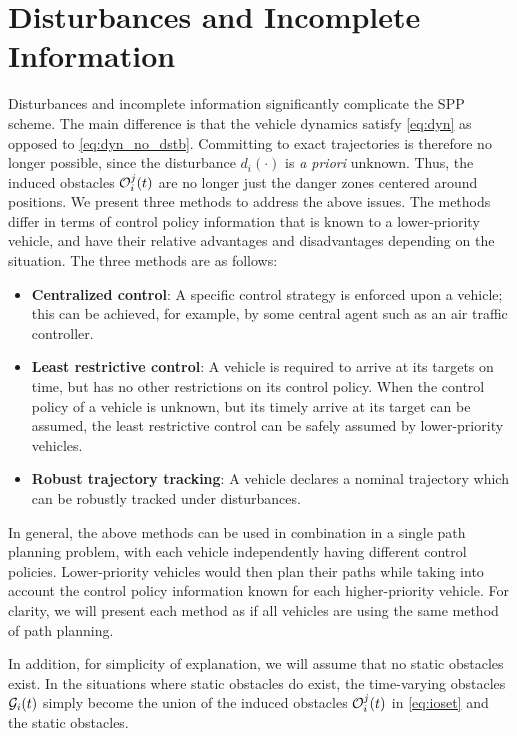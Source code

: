 \section{Disturbances and Incomplete Information \label{sec:incomp}}
Disturbances and incomplete information significantly complicate the SPP scheme. The main difference is that the vehicle dynamics satisfy \eqref{eq:dyn} as opposed to \eqref{eq:dyn_no_dstb}. Committing to exact trajectories is therefore no longer possible, since the disturbance $d_i(\cdot)$ is \textit{a priori} unknown. Thus, the induced obstacles $\mathcal{O}_i^j(t)$ are no longer just the danger zones centered around positions. We present three methods to address the above issues. The methods differ in terms of control policy information that is known to a lower-priority vehicle, and have their relative advantages and disadvantages depending on the situation. The three methods are as follows:
\begin{itemize}
\item \textbf{Centralized control}: A specific control strategy is enforced upon a vehicle; this can be achieved, for example, by some central agent such as an air traffic controller.
\item \textbf{Least restrictive control}: A vehicle is required to arrive at its targets on time, but has no other restrictions on its control policy. When the control policy of a vehicle is unknown, but its timely arrive at its target can be assumed, the least restrictive control can be safely assumed by lower-priority vehicles.
\item \textbf{Robust trajectory tracking}: A vehicle declares a nominal trajectory which can be robustly tracked under disturbances.
\end{itemize}

In general, the above methods can be used in combination in a single path planning problem, with each vehicle independently having different control policies. Lower-priority vehicles would then plan their paths while taking into account the control policy information known for each higher-priority vehicle. For clarity, we will present each method as if all vehicles are using the same method of path planning.

In addition, for simplicity of explanation, we will assume that no static obstacles exist. In the situations where static obstacles do exist, the time-varying obstacles $\mathcal{G}_i(t)$ simply become the union of the induced obstacles $\mathcal{O}_i^j(t)$ in \eqref{eq:ioset} and the static obstacles.


